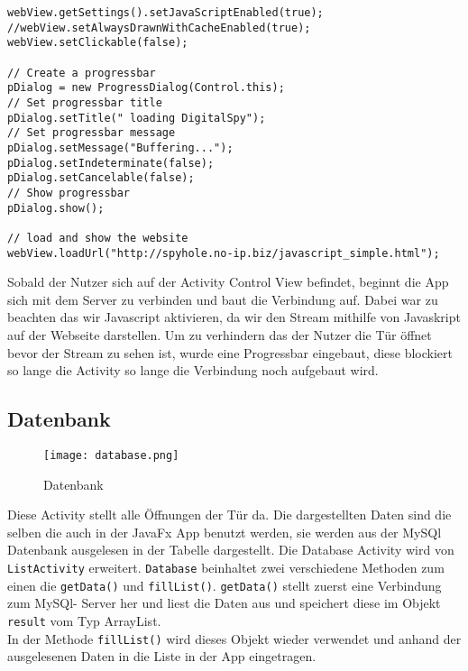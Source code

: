 \begin{lstlisting}[caption={Aufbau der Verbindung und darstellen des Streams},captionpos=b]
webView.getSettings().setJavaScriptEnabled(true);
//webView.setAlwaysDrawnWithCacheEnabled(true);
webView.setClickable(false);

// Create a progressbar
pDialog = new ProgressDialog(Control.this);
// Set progressbar title
pDialog.setTitle(" loading DigitalSpy");
// Set progressbar message
pDialog.setMessage("Buffering...");
pDialog.setIndeterminate(false);
pDialog.setCancelable(false);
// Show progressbar
pDialog.show();

// load and show the website
webView.loadUrl("http://spyhole.no-ip.biz/javascript_simple.html");

\end{lstlisting}
Sobald der Nutzer sich auf der Activity Control View befindet, beginnt die App sich mit dem Server zu verbinden und baut die Verbindung auf. Dabei war zu beachten das wir Javascript aktivieren, da wir den Stream mithilfe von Javaskript auf der Webseite darstellen. Um zu verhindern das der Nutzer die Tür öffnet bevor der Stream zu sehen ist, wurde eine Progressbar eingebaut, diese blockiert so lange die Activity so lange die Verbindung noch aufgebaut wird.

\subsection{Datenbank}
\begin{figure}[h]
  \begin{center}
    \texttt{[image: database.png]}
  		  \caption{Datenbank}
     \label{fig.Prozess}
  \end{center}
\end{figure}
Diese Activity stellt alle Öffnungen der Tür da. Die dargestellten Daten sind die selben die auch in der JavaFx App benutzt werden, sie werden aus der MySQl Datenbank ausgelesen in der Tabelle dargestellt.
Die Database Activity wird von \texttt{ListActivity} erweitert. \texttt{Database} beinhaltet zwei verschiedene Methoden zum einen die \texttt{getData()} und \texttt{fillList()}.  \texttt{getData()} stellt zuerst eine Verbindung zum MySQl- Server her und liest die Daten aus und speichert diese im Objekt \texttt{result} vom Typ ArrayList.\\
In der Methode \texttt{fillList()} wird dieses Objekt wieder verwendet und anhand der ausgelesenen Daten in die Liste in der App eingetragen.